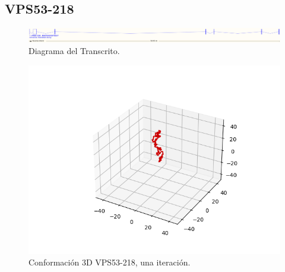 \documentclass[a4paper,11pt,titlepage]{article}
\theoremstyle{definition}
\begin{document}
\newpage
\subsection*{VPS53-218}\label{subsec:gene3}

\begin{figure}[H]
    \centering
    \includegraphics[width=\textwidth]{images/VPS53-218.png}
    \caption{Diagrama del Transcrito.}
    \label{fig:VPS53-218-diag}
\end{figure}

\begin{figure}[H]
    \centering
    \begin{minipage}[c]{0.45\textwidth}
        \centering
        \includegraphics[width=\textwidth]{images/VPS53-218-db_one.png}
        \caption{Conformación 3D VPS53-218, una iteración.}
        \label{fig:VPS53-218-one}
    \end{minipage}
    \hfill
    \begin{minipage}[c]{0.45\textwidth}
        \centering

\end{minipage}
\end{figure}
\end{document}
